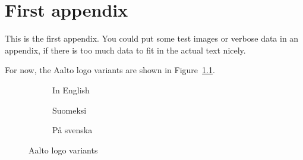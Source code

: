 \chapter{First appendix}
\label{chapter:first-appendix}

This is the first appendix. You could put some test images or verbose data in an
appendix, if there is too much data to fit in the actual text nicely.

For now, the Aalto logo variants are shown in Figure~\ref{fig:aaltologo}.

\begin{figure}
\begin{center}
 \begin{subfigure}[b]{\textwidth}
  {}
  \caption{In English}
 \end{subfigure}
 \begin{subfigure}[b]{\textwidth}
  {}
  \caption{Suomeksi}
 \end{subfigure}
 \begin{subfigure}[b]{\textwidth}
  {}
  \caption{P\r{a} svenska}
 \end{subfigure}
\caption{Aalto logo variants}
\label{fig:aaltologo}
\end{center}
\end{figure}
